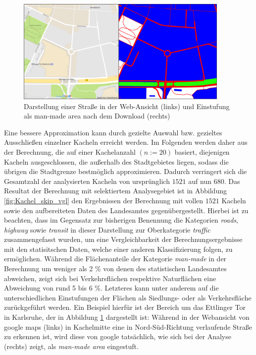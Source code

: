 \documentclass[12pt,a4paper]{scrartcl}
\begin{document}
%
%
\newline
\begin{figure}
  \centering
    \includegraphics[width=0.92\textwidth]{images/3_google_Einstufung_Nutzung.png}
    \caption{Darstellung einer Straße in der Web-Ansicht (links) und Einstufung als man-made area nach dem Download (rechts)}
    \label{fig:versch_nutz_einstuf}
\end{figure}
%
Eine bessere Approximation kann durch gezielte Auswahl bzw. gezieltes Ausschließen einzelner Kacheln erreicht werden. Im Folgenden werden daher aus der Berechnung, die auf einer Kachelanzahl \((n:=20)\) basiert, diejenigen Kacheln ausgeschlossen, die außerhalb des Stadtgebietes liegen, sodass die übrigen die Stadtgrenze bestmöglich approximieren. Dadurch verringert sich die Gesamtzahl der analysierten Kacheln von  ursprünglich \(1521\) auf nun \(680\). Das Resultat der Berechnung mit selektiertem Analysegebiet ist in Abbildung \ref{fig:Kachel_skip_vgl} den Ergebnissen der Berechnung mit vollen \(1521\) Kacheln sowie den aufbereiteten Daten des Landesamtes gegenübergestellt. Hierbei ist zu beachten, dass im Gegensatz zur bisherigen Benennung die Kategorien \textit{roads}, \textit{highway} sowie \textit{transit} in dieser Darstellung zur Oberkategorie \textit{traffic} zusammengefasst wurden, um eine Vergleichbarkeit der Berechnungsergebnisse mit den statisitschen Daten, welche einer anderen Klassifizierung folgen, zu ermöglichen. Während die Flächenanteile der Kategorie \textit{man-made} in der Berechnung um weniger als  \num{2} \% von denen des statistischen Landesamtes abweichen, zeigt sich bei Verkehrsflächen respektive Naturflächen eine Abweichung von rund \num{5} bis \num{6} \%. Letzteres kann unter anderem auf die unterschiedlichen Einstufungen der Flächen als Siedlungs- oder als Verkehrsfläche zurückgeführt werden. Ein Beispiel hierfür ist der Bereich um das Ettlinger Tor in Karlsruhe, der in Abbildung \ref{fig:versch_nutz_einstuf} dargestellt ist: Während in der Webansicht von google maps (links) in Kachelmitte eine in Nord-Süd-Richtung verlaufende Straße zu erkennen ist, wird diese von google tatsächlich, wie sich bei der Analyse (rechts) zeigt, als \textit{man-made area} eingestuft.\\
\end{document}
